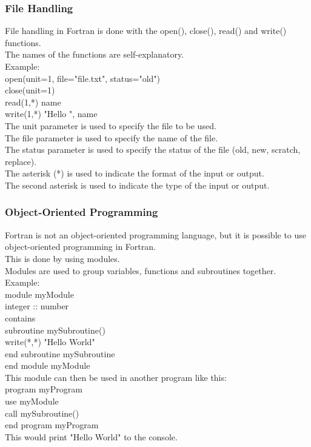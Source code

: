\documentclass[12pt,a4paper]{scrartcl}
\begin{document}
\subsubsection{File Handling}%
File handling in Fortran is done with the open(), close(), read() and write() functions.\\
The names of the functions are self-explanatory.\\
Example:\\
open(unit=1, file="file.txt", status="old")\\
close(unit=1)\\
read(1,*) name\\
write(1,*) "Hello ", name\\
The unit parameter is used to specify the file to be used.\\
The file parameter is used to specify the name of the file.\\
The status parameter is used to specify the status of the file (old, new, scratch, replace).\\
The asterisk (*) is used to indicate the format of the input or output.\\
The second asterisk is used to indicate the type of the input or output.\\

\subsubsection{Object-Oriented Programming}
Fortran is not an object-oriented programming language, but it is possible to use object-oriented programming in Fortran.\\
This is done by using modules.\\
Modules are used to group variables, functions and subroutines together.\\
Example:\\
module myModule\\
integer :: number\\
contains\\
subroutine mySubroutine()\\
write(*,*) "Hello World"\\
end subroutine mySubroutine\\
end module myModule\\
This module can then be used in another program like this:\\
program myProgram\\
use myModule\\
call mySubroutine()\\
end program myProgram\\
This would print "Hello World" to the console.\\
\end{document}
